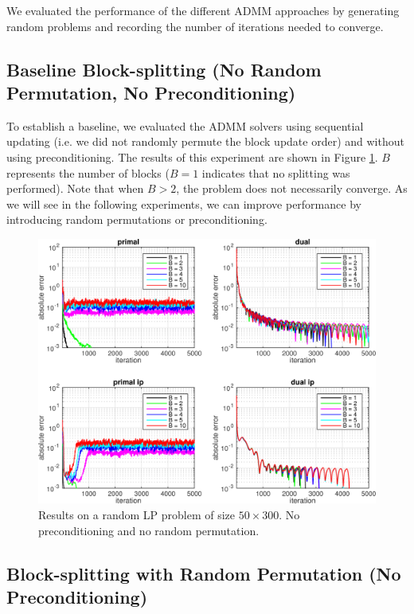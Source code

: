 \documentclass{article}
\begin{document}
We evaluated the performance of the different ADMM approaches by generating random problems and recording the number of iterations needed to converge.

\newpage
\subsection*{Baseline Block-splitting (No Random Permutation, No Preconditioning)}
To establish a baseline, we evaluated the ADMM solvers using sequential updating (i.e. we did not randomly permute the block update order) and without using preconditioning. The results of this experiment are shown in Figure \ref{fig:nop_nor}. $B$ represents the number of blocks ($B=1$ indicates that no splitting was performed). Note that when $B>2$, the problem does not necessarily converge. As we will see in the following experiments, we can improve performance by introducing random permutations or preconditioning.

\begin{figure}[h]
	\includegraphics[width=\textwidth]{../figures/noprecond_norndperm.png}
	\caption{Results on a random LP problem of size $50 \times 300$. No preconditioning and no random permutation.}
	\label{fig:nop_nor}
\end{figure}

\subsection*{Block-splitting with Random Permutation (No Preconditioning)}
\end{document}
